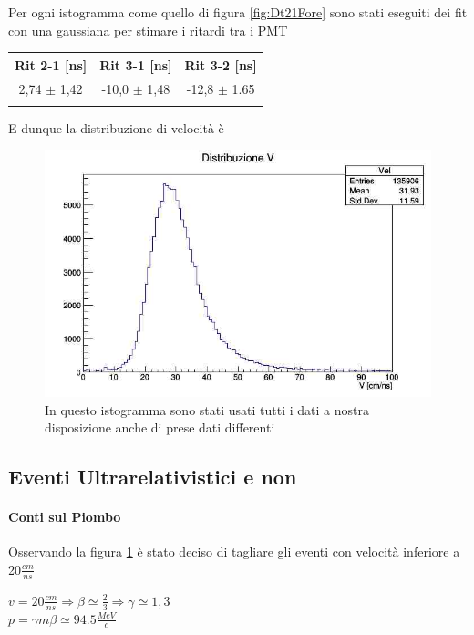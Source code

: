 \documentclass[a4paper]{article}
\begin{document}
Per ogni istogramma come quello di figura \ref{fig:Dt21Fore} sono stati eseguiti dei fit con una gaussiana per stimare i ritardi tra i PMT

\begin{tabular}{|c|c|c|}
\hline
Rit 2-1 [ns] & Rit 3-1 [ns] & Rit 3-2 [ns] \\
\hline
2,74 $\pm$ 1,42 & -10,0 $\pm$ 1,48 & -12,8 $\pm$ 1.65\\
\hline
\label{tab:RitFore}
\end{tabular}

E dunque la distribuzione di velocità è

\begin{figure}[H]
\centering
\includegraphics[scale=0.4]{./immagini/TimeOfFlight/VTripleFore.jpg}
\caption{In questo istogramma sono stati usati tutti i dati a nostra disposizione anche di prese dati differenti}
\label{fig:VFore}
\end{figure}

\subsection{Eventi Ultrarelativistici e non}
\label{sec:RapportoU-N}
\paragraph{Conti sul Piombo}
Osservando la figura \ref{fig:VFore} è stato deciso di tagliare gli eventi con velocità inferiore a 20$\frac{cm}{ns}$
\begin{center}
$v = 20\frac{cm}{ns} \Rightarrow \beta \simeq \frac{2}{3} \Rightarrow \gamma \simeq 1,3$ \\ $ p=\gamma m \beta \simeq 94.5 \frac{MeV}{c} $
\end{center}
\end{document}
